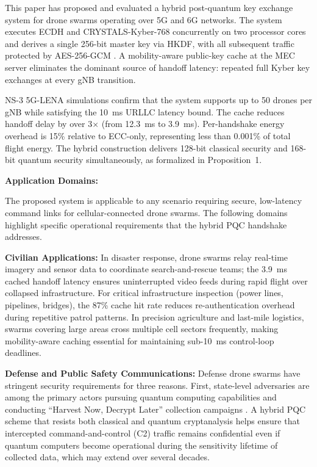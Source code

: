 \documentclass{ieeeaccess}
\begin{document}
This paper has proposed and evaluated a hybrid post-quantum key exchange system for drone swarms operating over 5G and 6G networks. The system executes ECDH and CRYSTALS-Kyber-768 concurrently on two processor cores and derives a single 256-bit master key via HKDF, with all subsequent traffic protected by AES-256-GCM \cite{ref15}. A mobility-aware public-key cache at the MEC server eliminates the dominant source of handoff latency: repeated full Kyber key exchanges at every gNB transition.

NS-3 5G-LENA simulations confirm that the system supports up to 50 drones per gNB while satisfying the 10~ms URLLC latency bound. The cache reduces handoff delay by over 3$\times$ (from 12.3~ms to 3.9~ms). Per-handshake energy overhead is 15\% relative to ECC-only, representing less than 0.001\% of total flight energy. The hybrid construction delivers 128-bit classical security and 168-bit quantum security simultaneously, as formalized in Proposition~1.

\vspace{2mm}\noindent\textbf{Application Domains:}

The proposed system is applicable to any scenario requiring secure, low-latency command links for cellular-connected drone swarms. The following domains highlight specific operational requirements that the hybrid PQC handshake addresses.

\textbf{Civilian Applications:} In disaster response, drone swarms relay real-time imagery and sensor data to coordinate search-and-rescue teams; the 3.9~ms cached handoff latency ensures uninterrupted video feeds during rapid flight over collapsed infrastructure. For critical infrastructure inspection (power lines, pipelines, bridges), the 87\% cache hit rate reduces re-authentication overhead during repetitive patrol patterns. In precision agriculture and last-mile logistics, swarms covering large areas cross multiple cell sectors frequently, making mobility-aware caching essential for maintaining sub-10~ms control-loop deadlines.

\textbf{Defense and Public Safety Communications:} Defense drone swarms have stringent security requirements for three reasons. First, state-level adversaries are among the primary actors pursuing quantum computing capabilities and conducting ``Harvest Now, Decrypt Later'' collection campaigns \cite{ref21}. A hybrid PQC scheme that resists both classical and quantum cryptanalysis helps ensure that intercepted command-and-control (C2) traffic remains confidential even if quantum computers become operational during the sensitivity lifetime of collected data, which may extend over several decades.
\end{document}
